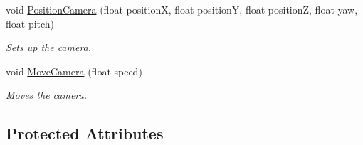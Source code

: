 \begin{CompactItemize}
void \hyperlink{class_camera_e32a72f519739a0b4dce07433cfbe9ef}{PositionCamera} (float positionX, float positionY, float positionZ, float yaw, float pitch)
\begin{CompactList}\small\item\em Sets up the camera. \item\end{CompactList}\item 
void \hyperlink{class_camera_ec3a27aa4de4ad2d10d421ee2fa54223}{MoveCamera} (float speed)
\begin{CompactList}\small\item\em Moves the camera. \item\end{CompactList}\end{CompactItemize}
\subsection*{Protected Attributes}
